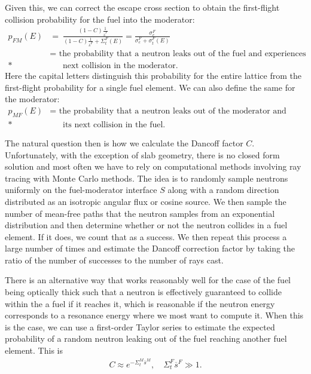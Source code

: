 Given this, we can correct the escape cross section to obtain the first-flight collision probability for the fuel into the moderator:
\begin{align}
  p_{FM}(E) &= \ \frac{ (1 - C) \frac{1}{\overline{s}^F} }{ (1 - C) \frac{1}{\overline{s}^F}+ \Sigma_t^F(E) } = \frac{ \sigma_e^F }{ \sigma_e^F + \sigma_t^F(E) } \label{Eq:thermalization_wignerRationalApproximation_pFM} \\
  &= \text{ the probability that a neutron leaks out of the fuel and experiences its } \nonumber \\*
  &\quad \ \text{ next collision in the moderator.} \nonumber
\end{align}
Here the capital letters distinguish this probability for the entire lattice from the first-flight probability for a single fuel element. We can also define the same for the moderator:
\begin{align}
  p_{MF}(E) 
  &= \text{ the probability that a neutron leaks out of the moderator and experiences } \nonumber \\*
  &\quad \ \text{ its next collision in the fuel.} \nonumber
\end{align}

The natural question then is how we calculate the Dancoff factor $C$. Unfortunately, with the exception of slab geometry, there is no closed form solution and most often we have to rely on computational methods involving ray tracing with Monte Carlo methods. The idea is to randomly sample neutrons uniformly on the fuel-moderator interface $S$ along with a random direction distributed as an isotropic angular flux or cosine source. We then sample the number of mean-free paths that the neutron samples from an exponential distribution and then determine whether or not the neutron collides in a fuel element. If it does, we count that as a success. We then repeat this process a large number of times and estimate the Dancoff correction factor by taking the ratio of the number of successes to the number of rays cast.

There is an alternative way that works reasonably well for the case of the fuel being optically thick such that a neutron is effectively guaranteed to collide within the a fuel if it reaches it, which is reasonable if the neutron energy corresponds to a resonance energy where we most want to compute it. When this is the case, we can use a first-order Taylor series to estimate the expected probability of a random neutron leaking out of the fuel reaching another fuel element. This is
\begin{align}
  C \approx e^{-\Sigma_t^M \overline{s}^M} , \quad \Sigma_t^{F} \overline{s}^F \gg 1.
\end{align}

